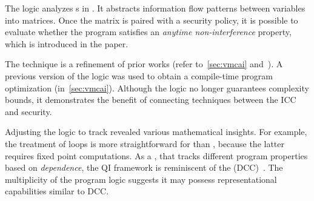 The logic analyzes s in . It
abstracts information flow patterns between variables into matrices. Once the
matrix is paired with a security policy, it is
possible to evaluate whether the program satisfies an \emph{anytime
non-interference} property, which is introduced
in the paper.

The technique is a refinement of prior works (refer to~\autoref{sec:vmcai}
and~\cite{moyen20172}). A previous version of the logic was used to obtain a
compile-time program optimization (in~\autoref{sec:vmcai}). Although the logic
no longer guarantees complexity bounds, it demonstrates the benefit of
connecting techniques between the ICC and security.

Adjusting the logic to track  revealed various
mathematical insights. For example, the treatment of loops is more
straightforward for  than ,
because the latter requires fixed point computations. As a , that tracks different program properties based on
\emph{dependence}, the QI framework is reminiscent of the
 (DCC)~\cite{abadi1999b}. The multiplicity of the
program logic suggests it may possess representational capabilities similar to
DCC\@.
